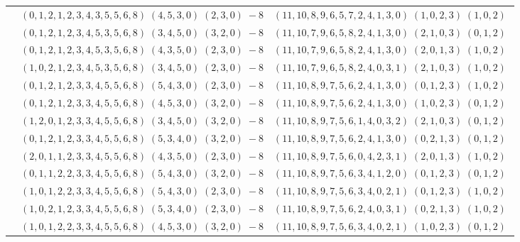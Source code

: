 \documentclass[11pt]{article}
\begin{document}
\begin{longtable}[l]{|c|c|c|}
 \cline{2-3} 
 & $(0 ,1 ,2 ,1 ,2 ,3 ,4 ,3 ,5 ,5 ,6 ,8) \;(4 ,5 ,3 ,0) \;(2 ,3 ,0) \;-8$ & $(11 ,10 ,8 ,9 ,6 ,5 ,7 ,2 ,4 ,1 ,3 ,0) \;(1 ,0 ,2 ,3) \;(1 ,0 ,2) \;$\\ 
 \cline{2-3} 
 & $(0 ,1 ,2 ,1 ,2 ,3 ,4 ,5 ,3 ,5 ,6 ,8) \;(3 ,4 ,5 ,0) \;(3 ,2 ,0) \;-8$ & $(11 ,10 ,7 ,9 ,6 ,5 ,8 ,2 ,4 ,1 ,3 ,0) \;(2 ,1 ,0 ,3) \;(0 ,1 ,2) \;$\\ 
 \cline{2-3} 
 & $(0 ,1 ,2 ,1 ,2 ,3 ,4 ,5 ,3 ,5 ,6 ,8) \;(4 ,3 ,5 ,0) \;(2 ,3 ,0) \;-8$ & $(11 ,10 ,7 ,9 ,6 ,5 ,8 ,2 ,4 ,1 ,3 ,0) \;(2 ,0 ,1 ,3) \;(1 ,0 ,2) \;$\\ 
 \cline{2-3} 
 & $(1 ,0 ,2 ,1 ,2 ,3 ,4 ,5 ,3 ,5 ,6 ,8) \;(3 ,4 ,5 ,0) \;(2 ,3 ,0) \;-8$ & $(11 ,10 ,7 ,9 ,6 ,5 ,8 ,2 ,4 ,0 ,3 ,1) \;(2 ,1 ,0 ,3) \;(1 ,0 ,2) \;$\\ 
 \cline{2-3} 
 & $(0 ,1 ,2 ,1 ,2 ,3 ,3 ,4 ,5 ,5 ,6 ,8) \;(5 ,4 ,3 ,0) \;(2 ,3 ,0) \;-8$ & $(11 ,10 ,8 ,9 ,7 ,5 ,6 ,2 ,4 ,1 ,3 ,0) \;(0 ,1 ,2 ,3) \;(1 ,0 ,2) \;$\\ 
 \cline{2-3} 
 & $(0 ,1 ,2 ,1 ,2 ,3 ,3 ,4 ,5 ,5 ,6 ,8) \;(4 ,5 ,3 ,0) \;(3 ,2 ,0) \;-8$ & $(11 ,10 ,8 ,9 ,7 ,5 ,6 ,2 ,4 ,1 ,3 ,0) \;(1 ,0 ,2 ,3) \;(0 ,1 ,2) \;$\\ 
 \cline{2-3} 
 & $(1 ,2 ,0 ,1 ,2 ,3 ,3 ,4 ,5 ,5 ,6 ,8) \;(3 ,4 ,5 ,0) \;(3 ,2 ,0) \;-8$ & $(11 ,10 ,8 ,9 ,7 ,5 ,6 ,1 ,4 ,0 ,3 ,2) \;(2 ,1 ,0 ,3) \;(0 ,1 ,2) \;$\\ 
 \cline{2-3} 
 & $(0 ,1 ,2 ,1 ,2 ,3 ,3 ,4 ,5 ,5 ,6 ,8) \;(5 ,3 ,4 ,0) \;(3 ,2 ,0) \;-8$ & $(11 ,10 ,8 ,9 ,7 ,5 ,6 ,2 ,4 ,1 ,3 ,0) \;(0 ,2 ,1 ,3) \;(0 ,1 ,2) \;$\\ 
 \cline{2-3} 
 & $(2 ,0 ,1 ,1 ,2 ,3 ,3 ,4 ,5 ,5 ,6 ,8) \;(4 ,3 ,5 ,0) \;(2 ,3 ,0) \;-8$ & $(11 ,10 ,8 ,9 ,7 ,5 ,6 ,0 ,4 ,2 ,3 ,1) \;(2 ,0 ,1 ,3) \;(1 ,0 ,2) \;$\\ 
 \cline{2-3} 
 & $(0 ,1 ,1 ,2 ,2 ,3 ,3 ,4 ,5 ,5 ,6 ,8) \;(5 ,4 ,3 ,0) \;(3 ,2 ,0) \;-8$ & $(11 ,10 ,8 ,9 ,7 ,5 ,6 ,3 ,4 ,1 ,2 ,0) \;(0 ,1 ,2 ,3) \;(0 ,1 ,2) \;$\\ 
 \cline{2-3} 
 & $(1 ,0 ,1 ,2 ,2 ,3 ,3 ,4 ,5 ,5 ,6 ,8) \;(5 ,4 ,3 ,0) \;(2 ,3 ,0) \;-8$ & $(11 ,10 ,8 ,9 ,7 ,5 ,6 ,3 ,4 ,0 ,2 ,1) \;(0 ,1 ,2 ,3) \;(1 ,0 ,2) \;$\\ 
 \cline{2-3} 
 & $(1 ,0 ,2 ,1 ,2 ,3 ,3 ,4 ,5 ,5 ,6 ,8) \;(5 ,3 ,4 ,0) \;(2 ,3 ,0) \;-8$ & $(11 ,10 ,8 ,9 ,7 ,5 ,6 ,2 ,4 ,0 ,3 ,1) \;(0 ,2 ,1 ,3) \;(1 ,0 ,2) \;$\\ 
 \cline{2-3} 
 & $(1 ,0 ,1 ,2 ,2 ,3 ,3 ,4 ,5 ,5 ,6 ,8) \;(4 ,5 ,3 ,0) \;(3 ,2 ,0) \;-8$ & $(11 ,10 ,8 ,9 ,7 ,5 ,6 ,3 ,4 ,0 ,2 ,1) \;(1 ,0 ,2 ,3) \;(0 ,1 ,2) \;$\\ 

\end{longtable}
\end{document}
